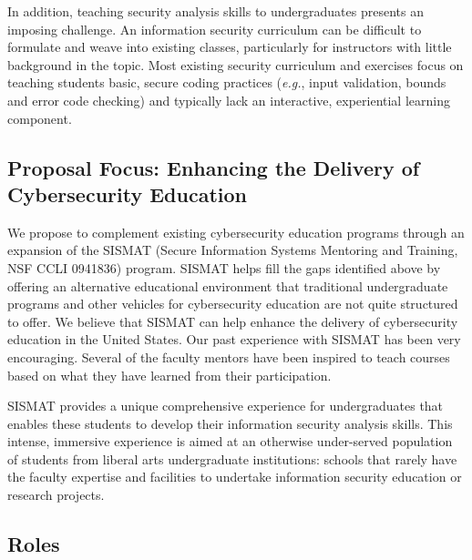 In addition, teaching security analysis skills to undergraduates
presents an imposing challenge.  An information security curriculum
can be difficult to formulate and weave into existing classes,
particularly for instructors with little background in the topic.
Most existing security curriculum and exercises focus on teaching
students basic, secure coding practices ({\it e.g.}, input validation,
bounds and error code checking) and typically lack an interactive,
experiential learning component.

\subsection{Proposal Focus: Enhancing the Delivery of Cybersecurity Education}

We propose to complement existing cybersecurity education programs
through an expansion of the SISMAT (Secure Information Systems
Mentoring and Training, NSF CCLI 0941836) program.  SISMAT helps fill
the gaps identified above by offering an alternative educational
environment that traditional undergraduate programs and other vehicles
for cybersecurity education are not quite structured to offer.  We
believe that SISMAT can help enhance the delivery of cybersecurity
education in the United States.  Our past experience with SISMAT has
been very encouraging.  Several of the faculty mentors have been
inspired to teach courses based on what they have learned from their
participation.

SISMAT provides a unique comprehensive experience for undergraduates
that enables these students to develop their information security
analysis skills.  This intense, immersive experience is aimed at an
otherwise under-served population of students from liberal arts
undergraduate institutions: schools that rarely have the faculty
expertise and facilities to undertake information security education
or research projects.

\subsection{Roles}

